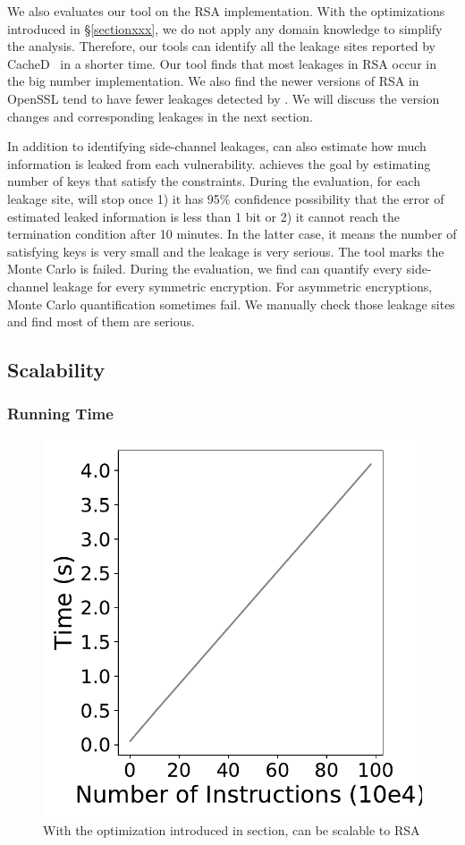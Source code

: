 We also evaluates our tool on the RSA implementation. With the optimizations
introduced in \S\ref{sectionxxx}, we do not apply any domain knowledge to 
simplify the analysis. Therefore, our tools can identify all the leakage 
sites reported by CacheD~\cite{203878} in a shorter time. Our tool
 finds that most leakages in RSA occur in the big number implementation.
We also find the newer versions of RSA in OpenSSL tend to have fewer leakages detected
by \tool{}. We will discuss the version changes and corresponding leakages 
in the next section.

In addition to identifying side-channel leakages, \tool{} can also estimate how
much information is leaked from each vulnerability. \tool{} achieves 
the goal by estimating number of keys that satisfy the constraints.
During the evaluation, for each leakage site, 
\tool{} will stop once 1) it has 95\% confidence 
possibility that the error of estimated leaked information is less than
1 bit or 2) it cannot reach the termination condition after 10 minutes. In 
the latter case, it means the number of satisfying keys is very small and the leakage is 
very serious. The tool marks the Monte Carlo is failed. During the 
evaluation, we find \tool{} can quantify every side-channel leakage 
for every symmetric encryption. For asymmetric encryptions, Monte 
Carlo quantification sometimes fail. We manually check those leakage 
sites and find most of them are serious. 
\subsection{Scalability}\label{eval:scala}

\subsubsection{Running Time}
\begin{figure}
    \centering
     \includegraphics[width=.8\columnwidth]{./figures/result/running_time.pdf}
     \caption{With the optimization introduced in section, \tool{} can be scalable to RSA}
\end{figure}

